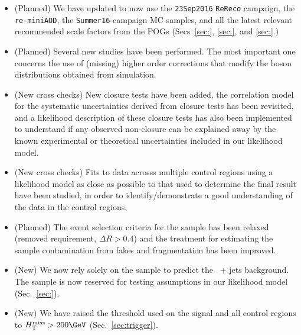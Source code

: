 \begin{itemize}
  
\item (Planned) We have updated to now use the \verb!23Sep2016!
  \verb!ReReco! campaign, the \verb!re-miniAOD!, the
  \verb!Summer16!-campaign MC samples, and all the latest relevant
  recommended scale factors from the POGs (Secs~\ref{sec:},
  \ref{sec:}, and \ref{sec:}.)
    
\item (Planned) Several new studies have been performed. The most
  important one concerns the use of (missing) higher order corrections
  that modify the boson \Pt distributions obtained from simulation.

\item (New cross checks) New closure tests have been added, the
  correlation model for the systematic uncertainties derived from
  closure tests has been revisited, and a likelihood description of
  these closure tests has also been implemented to understand if any
  observed non-closure can be explained away by the known experimental
  or theoretical uncertainties included in our likelihood model.

\item (New cross checks) Fits to data acrosss multiple control regions
  using a likelihood model as close as possible to that used to
  determine the final result have been studied, in order to
  identify/demonstrate a good understanding of the data in the control
  regions.

\item (Planned) The event selection criteria for the \gj sample has
  been relaxed (removed \alphat requirement, $\Delta R > 0.4$) and the
  treatment for estimating the sample contamination from fakes and
  fragmentation has been improved.

\item (New) We now rely solely on the \mmj sample to predict the
  \znunu\ + jets background. The \gj sample is now reserved for
  testing assumptions in our likelihood model (Sec.~\ref{sec:}).
  
\item (New) We have raised the \HTmiss threshold used on the signal
  and all control regions to $\HTmiss > 200\GeV$
  (Sec.~\ref{sec:trigger}).

\end{itemize}

